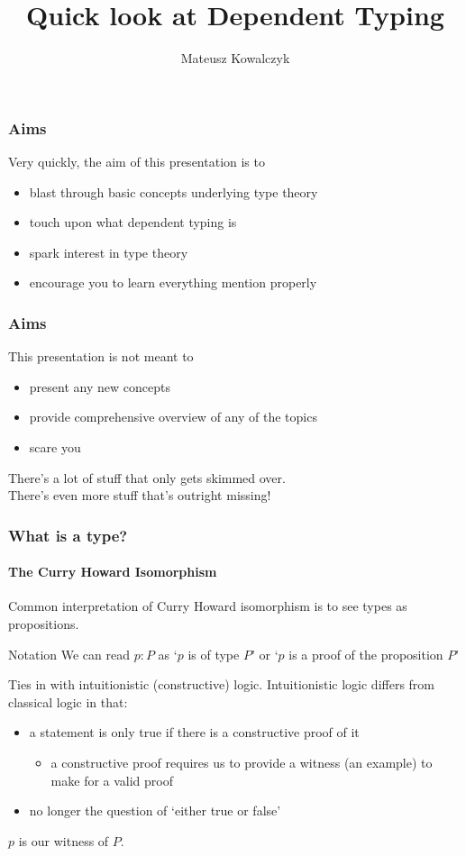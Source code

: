 \documentclass{beamer}
\title[Dependent Types]{Quick look at Dependent Typing}
\author{Mateusz Kowalczyk}
\institute{University of Bath}
\begin{document}
\begin{frame}
  \titlepage
\end{frame}
\begin{frame}
  \frametitle{Aims}
  Very quickly, the aim of this presentation is to
  \pause
  \begin{itemize}[<+->]
    \item blast through basic concepts underlying type theory
    \item touch upon what dependent typing is
    \item spark interest in type theory
    \item encourage you to learn everything mention properly
    \end{itemize}
\end{frame}
\begin{frame}
  \frametitle{Aims}
  This presentation is not meant to
  \pause
  \begin{itemize}[<+->]
    \item present any new concepts
    \item provide comprehensive overview of any of the topics
    \item scare you
  \end{itemize}
  \pause
  There's a lot of stuff that only gets skimmed over.\\
  There's even more stuff that's outright missing!
\end{frame}
\begin{frame}
  \frametitle{What is a type?}
  \framesubtitle{The Curry Howard Isomorphism}
  Common interpretation of Curry Howard isomorphism is to see types as
  propositions.
  \pause
  \begin{exampleblock}{Notation}
    We can read $p:P$ as `$p$ is of type $P$' or `$p$ is a proof of the
    proposition $P$'
  \end{exampleblock}
  \pause
  Ties in with intuitionistic (constructive) logic. Intuitionistic
  logic differs from classical logic in that:
  \pause
  \begin{itemize}[<+->]
    \item a statement is only true if there is a constructive proof of
      it
    \begin{itemize}
      \item a constructive proof requires us to provide a witness
          (an example) to make for a valid proof
    \end{itemize}
    \item no longer the question of `either true or false'
  \end{itemize}
  \pause
  $p$ is our witness of $P$.
\end{frame}
\end{document}
